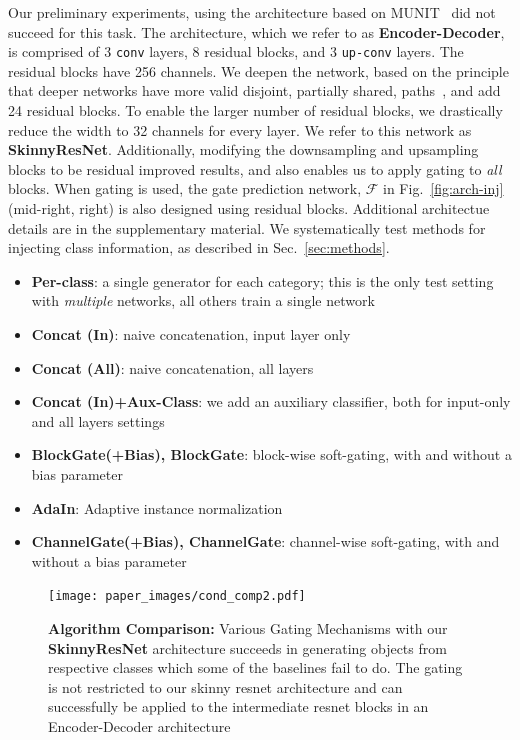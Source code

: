  Our preliminary experiments, using the architecture based on MUNIT~\cite{huang2018multimodal} did not succeed for this task. The architecture, which we refer to as \textbf{Encoder-Decoder}, is comprised of 3 \texttt{conv} layers, 8 residual blocks, and 3 \texttt{up-conv} layers. The residual blocks have 256 channels. We deepen the network, based on the principle that deeper networks have more valid disjoint, partially shared, paths~\cite{veit2016residual}, and add 24 residual blocks. To enable the larger number of residual blocks, we drastically reduce the width to 32 channels for every layer. We refer to this network as \textbf{SkinnyResNet}. Additionally, modifying the downsampling and upsampling blocks to be residual improved results, and also enables us to apply gating to {\em all} blocks. %
When gating is used, the gate prediction network, $\mathcal{F}$ in Fig.~\ref{fig:arch-inj} (mid-right, right) is also designed using residual blocks. Additional architectue details are in the supplementary material. 
We systematically test methods for injecting class information, as described in Sec.~\ref{sec:methods}. \begin{itemize}[noitemsep]
\item{\bf Per-class}: a single generator for each category; this is the only test setting with \textit{multiple} networks, all others train a single network
\item{\bf Concat (In)}: naive concatenation, input layer only
\item{\bf Concat (All)}: naive concatenation, all layers
\item{\bf Concat (In)+Aux-Class}: we add an auxiliary classifier, both for input-only and all layers settings
\item{\bf BlockGate(+Bias), BlockGate}: block-wise soft-gating, with and without a bias parameter
\item{\bf AdaIn}: Adaptive instance normalization
\item{\bf ChannelGate(+Bias), ChannelGate}: channel-wise soft-gating, with and without a bias parameter
\end{itemize}



\begin{figure}[h]
    \centering
    \texttt{[image: paper\_images/cond\_comp2.pdf]}
    \caption{{\bf Algorithm Comparison:} Various Gating Mechanisms with our \textbf{SkinnyResNet} architecture succeeds in generating objects from respective classes which some of the baselines fail to do. The gating is not restricted to our skinny resnet architecture and can successfully be applied to the intermediate resnet blocks in an Encoder-Decoder architecture \cite{huang2018multimodal} \label{fig:alg_comp} }
    \vspace{-4mm}
\end{figure}


